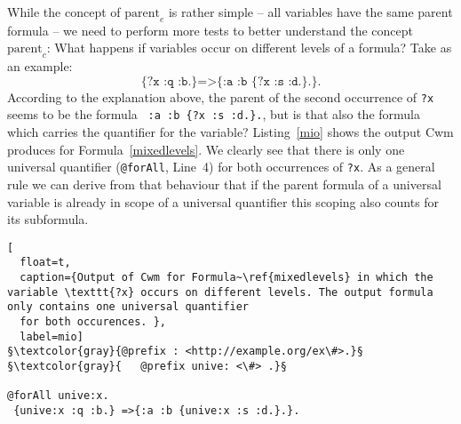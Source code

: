 While the concept of $\text{parent}_e$ is rather simple -- all variables have the same parent formula -- we need to perform more tests to better understand the concept $\text{parent}_c$: What happens 
if variables occur on different levels of a formula? Take as an example:
\begin{equation}\label{mixedlevels}
 \texttt{\{?x :q :b.\} =>\{ :a :b \{?x :s :d.\}.\}.}
\end{equation}
According to the explanation above, the parent of the second occurrence of \texttt{?x} seems to be the formula
\texttt{ :a :b \{?x :s :d.\}.}, but is that also the formula which carries the quantifier for the variable? Listing~\ref{mio} shows the output Cwm produces for Formula~\ref{mixedlevels}. 
We clearly see that there is only one universal quantifier (\texttt{@forAll}, Line~4)  for both occurrences of \texttt{?x}. 
As a general rule we can derive from that behaviour that if the parent formula of a universal variable is already in scope of a universal quantifier
this scoping also counts for its subformula. %
\begin{lstlisting}[
  float=t,
  caption={Output of Cwm for Formula~\ref{mixedlevels} in which the variable \texttt{?x} occurs on different levels. The output formula only contains one universal quantifier 
  for both occurences. },
  label=mio]  
§\textcolor{gray}{@prefix : <http://example.org/ex\#>.}§
§\textcolor{gray}{   @prefix unive: <\#> .}§

@forAll unive:x. 
 {unive:x :q :b.} =>{:a :b {unive:x :s :d.}.}.
\end{lstlisting}


